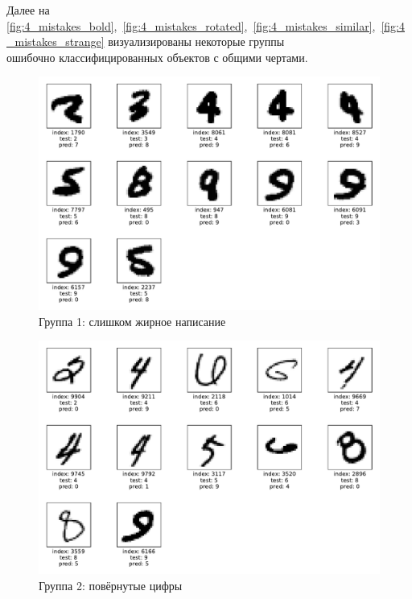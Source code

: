 \documentclass[12pt]{article}
\begin{document}
Далее на \autoref{fig:4_mistakes_bold},~\autoref{fig:4_mistakes_rotated},~\autoref{fig:4_mistakes_similar},~\autoref{fig:4_mistakes_strange} визуализированы некоторые группы\\
ошибочно классифицированных объектов с общими чертами.
\begin{figure}[!h]
    \centering
    \includegraphics[width=\textwidth]{4_mistakes_bold}
    \caption{Группа 1: слишком жирное написание}
    \label{fig:4_mistakes_bold}
\end{figure}
\begin{figure}[!h]
    \centering
    \includegraphics[width=\textwidth]{4_mistakes_rotated}
    \caption{Группа 2: повёрнутые цифры}
    \label{fig:4_mistakes_rotated}
\end{figure}
\end{document}
